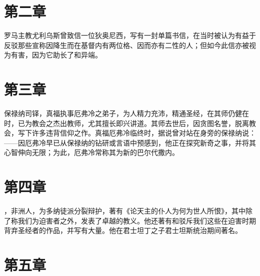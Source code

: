 
\section{第二章}

罗马主教尤利乌斯曾致信一位狄奥尼西，写有一封单篇书信，在当时被认为有益于反驳那些宣称因降生而在基督内有两位格、因而亦有二性的人；但如今此信亦被视为有害，因为它助长了和异端。\par


\section{第三章}

保禄纳司铎，真福执事厄弗冷之弟子，为人精力充沛，精通圣经，在其师仍健在时，已为教会之杰出教师，尤其擅长即兴讲道。其师去世后，因贪图名誉，脱离教会，写下许多违背信仰之作。真福厄弗冷临终时，据说曾对站在身旁的保禄纳说：——因厄弗冷早已从保禄纳的钻研或言语中预感到，他正在探究新奇之事，并将其心智伸向无限；为此，厄弗冷常称其为新的巴尔代撒内。\par


\section{第四章}

，非洲人，为多纳徒派分裂辩护，著有《论天主的仆人为何为世人所恨》，其中除了称我们为迫害者之外，发表了卓越的教义。他还著有和驳斥我们这些在迫害时期背弃圣经者的作品，并写有大量。他在君士坦丁之子君士坦斯统治期间著名。\par


\section{第五章}


